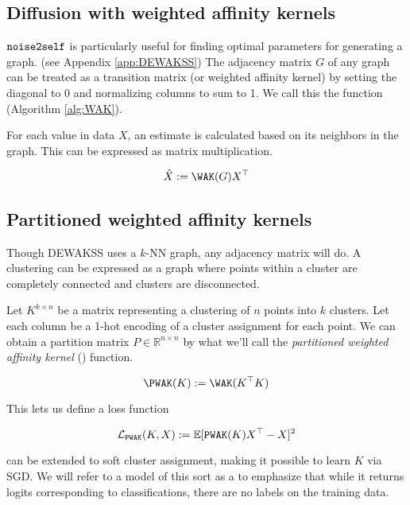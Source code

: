 \subsection{Diffusion with weighted affinity kernels}

$\mathop{\mathtt{noise2self}}\limits$ is particularly useful for finding optimal parameters for generating a graph\cite{tjarnberg2021}.
(see Appendix \ref{app:DEWAKSS})
The adjacency matrix $G$ of any graph can be treated as a transition matrix (or weighted affinity kernel) by setting the diagonal to 0 and normalizing columns to sum to 1. We call this the \WAK function (Algorithm \ref{alg:WAK}).

For each value in data $X$, an estimate is calculated based on its neighbors in the graph. This can be expressed as matrix multiplication.

\begin{equation}
  \label{eq:WAK}
\hat{X} := \WAK(G)X^\top
\end{equation}


\subsection{Partitioned weighted affinity kernels} 
\label{app:pwak}

Though DEWAKSS uses a $k$-NN graph, any adjacency matrix will do.
A clustering can be expressed as a graph where points within a cluster are completely connected and clusters are disconnected.

Let $K^{k \times n}$ be a matrix representing a clustering of $n$ points into $k$ clusters. Let each column be a 1-hot encoding of a cluster assignment for each point. We can obtain a partition matrix $P \in \mathbb{R}^{n \times n}$ by what we'll call the \textit{partitioned weighted affinity kernel} (\PWAK) function.

\begin{equation}
  \label{eq:PWAK}
  \PWAK(K) := \WAK(K^\top K)
\end{equation}

This lets us define a loss function

\begin{equation}
  \mathcal{L}_{\mathop{\mathtt{PWAK}}\limits}(K,X) := \mathbb{E}[\mathop{\mathtt{PWAK}}\limits(K)X^\top - X]^2
\end{equation}


\PWAK can be extended to soft cluster assignment, making it possible to learn $K$ via SGD.
We will refer to a model of this sort as a \Partitioner to emphasize that while it returns logits corresponding to classifications, there are no labels on the training data.

